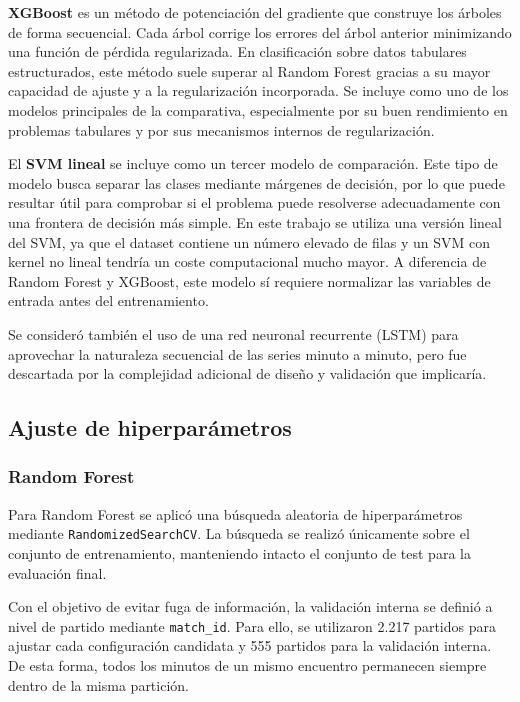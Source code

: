 \textbf{XGBoost} es un método de potenciación del gradiente que construye los árboles de forma secuencial. Cada árbol corrige los errores del árbol anterior minimizando una función de pérdida regularizada. En clasificación sobre datos tabulares estructurados, este método suele superar al Random Forest gracias a su mayor capacidad de ajuste y a la regularización incorporada. Se incluye como uno de los modelos principales de la comparativa, especialmente por su buen rendimiento en problemas tabulares y por sus mecanismos internos de regularización.

El \textbf{SVM lineal} se incluye como un tercer modelo de comparación. Este tipo de modelo busca separar las clases mediante márgenes de decisión, por lo que puede resultar útil para comprobar si el problema puede resolverse adecuadamente con una frontera de decisión más simple. En este trabajo se utiliza una versión lineal del SVM, ya que el dataset contiene un número elevado de filas y un SVM con kernel no lineal tendría un coste computacional mucho mayor. A diferencia de Random Forest y XGBoost, este modelo sí requiere normalizar las variables de entrada antes del entrenamiento.


Se consideró también el uso de una red neuronal recurrente (LSTM) para aprovechar la naturaleza secuencial de las series minuto a minuto, pero fue descartada por la complejidad adicional de diseño y validación que implicaría.

\subsection{Ajuste de hiperparámetros}

\subsubsection{Random Forest}

Para Random Forest se aplicó una búsqueda aleatoria de hiperparámetros mediante \texttt{RandomizedSearchCV}. La búsqueda se realizó únicamente sobre el conjunto de entrenamiento, manteniendo intacto el conjunto de test para la evaluación final.

Con el objetivo de evitar fuga de información, la validación interna se definió a nivel de partido mediante \texttt{match\_id}. Para ello, se utilizaron 2.217 partidos para ajustar cada configuración candidata y 555 partidos para la validación interna. De esta forma, todos los minutos de un mismo encuentro permanecen siempre dentro de la misma partición.

